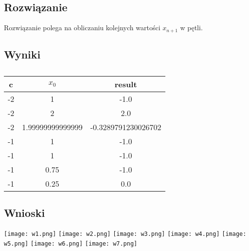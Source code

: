 \documentclass{article}
\begin{document}
\begin{center}
    \subsection{Rozwiązanie}
    \large Rozwiązanie polega na obliczaniu kolejnych wartości \(x_{n+1}\) w pętli.
    \subsection{Wyniki}
    
    \begin{table}[h!]
    \centering
    \begin{tabular}{||c c c||} 
    \hline
    \textbf{c} & \textbf{\(x_{0}\)}& \textbf{result} \\ [0.5ex]
    \hline\hline
    -2 & 1 & -1.0 \\
    -2 & 2 & 2.0 \\
    -2 & 1.99999999999999 & -0.3289791230026702 \\
    -1 & 1 & -1.0 \\
    -1 & 1 & -1.0 \\
    -1 & 0.75 & -1.0 \\
    -1 & 0.25 & 0.0 \\
    \hline
    \end{tabular}
    \caption{}
    \label{table:9}
    \end{table} 

    \subsection{Wnioski}
    \texttt{[image: w1.png]}
    \texttt{[image: w2.png]}
    \texttt{[image: w3.png]}
    \texttt{[image: w4.png]}
    \texttt{[image: w5.png]}
    \texttt{[image: w6.png]}
    \texttt{[image: w7.png]}

    
    \end{center}
\end{document}

